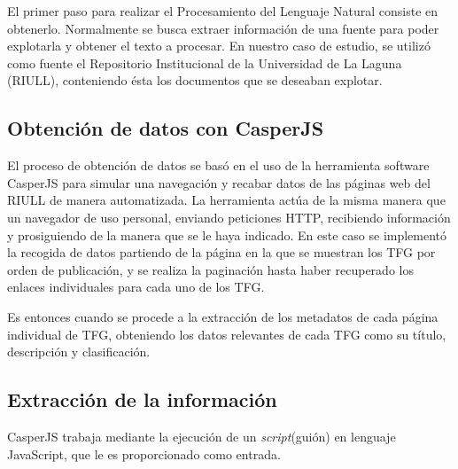 
El primer paso para realizar el Procesamiento del Lenguaje Natural consiste en obtenerlo. Normalmente se busca extraer información de una fuente para poder explotarla y obtener el texto a procesar.
%
En nuestro caso de estudio, se utilizó como fuente el Repositorio Institucional de la Universidad de La Laguna (RIULL), conteniendo ésta los documentos que se deseaban explotar.
%

\subsection{Obtención de datos con CasperJS}



El proceso de obtención de datos se basó en el uso de la herramienta software CasperJS \cite{casper-js} para simular una navegación y recabar datos de las páginas web del RIULL de manera automatizada.
%
La herramienta actúa de la misma manera que un navegador de uso personal, enviando peticiones HTTP, recibiendo información y prosiguiendo de la manera que se le haya indicado.
En este caso se implementó la recogida de datos partiendo de la página en la que se muestran los TFG por orden de publicación, y se realiza la paginación hasta haber recuperado los enlaces individuales para cada uno de los TFG.

Es entonces cuando se procede a la extracción de los metadatos de cada página individual de TFG, obteniendo los datos relevantes de cada TFG como su título, descripción y clasificación.

\subsection{Extracción de la información}

CasperJS trabaja mediante la ejecución de un \textit{script}(guión) en lenguaje JavaScript, que le es proporcionado como entrada.
